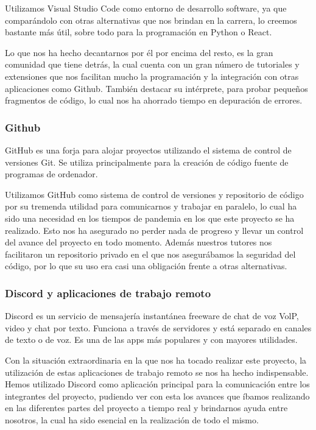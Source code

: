 			Utilizamos Visual Studio Code como entorno de desarrollo software, ya que comparándolo con otras alternativas que nos brindan en la carrera, lo creemos bastante más útil, sobre todo para la programación en Python o React.
			
			Lo que nos ha hecho decantarnos por él por encima del resto, es la gran comunidad que tiene detrás, la cual cuenta con un gran número de tutoriales y extensiones que nos facilitan mucho la programación y la integración con otras aplicaciones como Github. También destacar su intérprete, para probar pequeños fragmentos de código, lo cual nos ha ahorrado tiempo en depuración de errores.
			
 		\subsubsection*{Github}
			GitHub es una forja para alojar proyectos utilizando el sistema de control de versiones Git. Se utiliza principalmente para la creación de código fuente de programas de ordenador.  
			 
			Utilizamos GitHub como sistema de control de versiones y repositorio de código por su tremenda utilidad para comunicarnos y trabajar en paralelo, lo cual ha sido una necesidad en los tiempos de pandemia en los que este proyecto se ha realizado. Esto nos ha asegurado no perder nada de progreso y llevar un control del avance del proyecto en todo momento. Además nuestros tutores nos facilitaron un repositorio privado en el que nos asegurábamos la seguridad del código, por lo que su uso era casi una obligación frente a otras alternativas.
			
 		\subsubsection*{Discord y aplicaciones de trabajo remoto}
			Discord es un servicio de mensajería instantánea freeware de chat de voz VolP, video y chat por texto. Funciona a través de servidores y está separado en canales de texto o de voz. Es una de las apps más populares y con mayores utilidades.    
			
			Con la situación extraordinaria en la que nos ha tocado realizar este proyecto, la utilización de estas aplicaciones de trabajo remoto se nos ha hecho indispensable. Hemos utilizado Discord como aplicación principal para la comunicación entre los integrantes del proyecto, pudiendo ver con esta los avances que íbamos realizando en las diferentes partes del proyecto a tiempo real y brindarnos ayuda entre nosotros, la cual ha sido esencial en la realización de todo el mismo.
			
